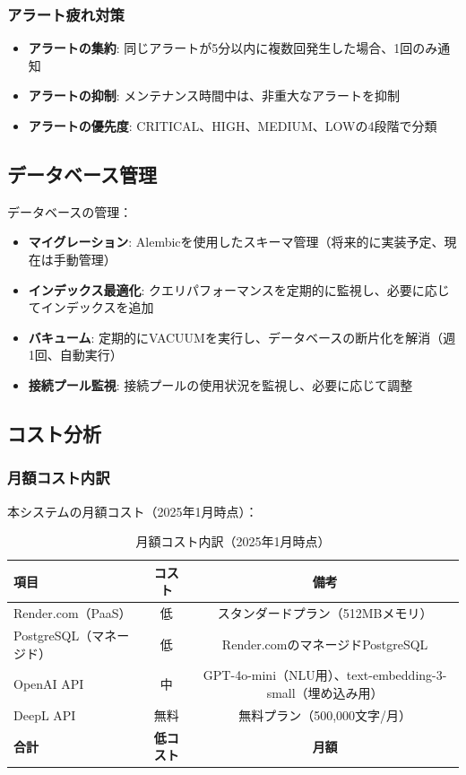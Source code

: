\documentclass[a4paper,11pt,ja=standard,xelatex]{bxjsarticle}
\theoremstyle{definition}
\begin{document}
\subsubsection{アラート疲れ対策}

\begin{itemize}
\item \textbf{アラートの集約}: 同じアラートが5分以内に複数回発生した場合、1回のみ通知
\item \textbf{アラートの抑制}: メンテナンス時間中は、非重大なアラートを抑制
\item \textbf{アラートの優先度}: CRITICAL、HIGH、MEDIUM、LOWの4段階で分類
\end{itemize}


\subsection{データベース管理}

データベースの管理：
\begin{itemize}
\item \textbf{マイグレーション}: Alembicを使用したスキーマ管理（将来的に実装予定、現在は手動管理）
\item \textbf{インデックス最適化}: クエリパフォーマンスを定期的に監視し、必要に応じてインデックスを追加
\item \textbf{バキューム}: 定期的にVACUUMを実行し、データベースの断片化を解消（週1回、自動実行）
\item \textbf{接続プール監視}: 接続プールの使用状況を監視し、必要に応じて調整
\end{itemize}

\subsection{コスト分析}

\subsubsection{月額コスト内訳}

本システムの月額コスト（2025年1月時点）：

\begin{table}[!htbp]
\centering
\caption{月額コスト内訳（2025年1月時点）}
\begin{tabular}{|l|c|c|}
\hline
\textbf{項目} & \textbf{コスト} & \textbf{備考} \\
\hline
Render.com（PaaS） & 低 & スタンダードプラン（512MBメモリ） \\
PostgreSQL（マネージド） & 低 & Render.comのマネージドPostgreSQL \\
OpenAI API & 中 & GPT-4o-mini（NLU用）、text-embedding-3-small（埋め込み用） \\
DeepL API & 無料 & 無料プラン（500,000文字/月） \\
\textbf{合計} & \textbf{低コスト} & \textbf{月額} \\
\hline
\end{tabular}
\end{table}
\end{document}
